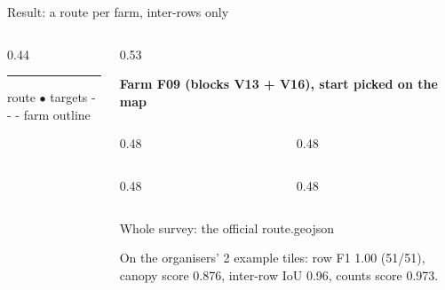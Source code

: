\documentclass[aspectratio=169, 11pt, t]{beamer}
\begin{document}
\begin{frame}{Result: a route per farm, inter-rows only}
  \begin{columns}[T]
    \begin{column}{0.44\textwidth}
      \centering\par\vspace{0.6mm}
      {\tiny\color{sxGrey}\textcolor{sxViolet}{\rule[0.4ex]{3mm}{1.2pt}} route \enspace
       \textcolor{sxAmber}{$\bullet$} targets \enspace
       {\color{sxGrey}- - -} farm outline\par}
    \end{column}
    \begin{column}{0.53\textwidth}
      {\scriptsize\bfseries\color{sxNight} Farm F09 (blocks V13 + V16), start picked on the map\par}
      \vspace{1.5mm}
      \begin{columns}[T, totalwidth=\linewidth]
        \begin{column}{0.48\linewidth}\end{column}
        \begin{column}{0.48\linewidth}\end{column}
      \end{columns}
      \vspace{2.2mm}
      \begin{columns}[T, totalwidth=\linewidth]
        \begin{column}{0.48\linewidth}\end{column}
        \begin{column}{0.48\linewidth}\end{column}
      \end{columns}
      \vspace{2.5mm}
      \begin{block}{Whole survey: the official route.geojson}
        \hfill
        \hfill
      \end{block}
      \vspace{1.5mm}
      {\tiny\color{sxMuted} On the organisers' 2 example tiles: row F1 1.00 (51/51), canopy score 0.876, inter-row IoU 0.96, counts score 0.973.\par}
    \end{column}
  \end{columns}
\end{frame}
\end{document}
